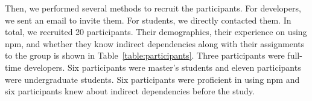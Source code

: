 \documentclass[conference]{IEEEtran}
\begin{document}
	Then, we performed several methods to recruit the participants. For developers, we sent an email to invite them. For students, we directly contacted them. In total, we recruited 20 participants. Their demographics, their experience on using npm, and whether they know indirect dependencies along with their assignments to the group is shown in Table~\ref{table:participants}. Three participants were full-time developers. Six participants were master's students and eleven participants were undergraduate students. Six participants were proficient in using npm and six participants knew about indirect dependencies before the study.
	
	\begin{table}[tb]
		\caption{Participants’ Demographic}
		\centering
\end{table}
\end{document}
